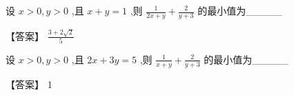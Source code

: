 \documentclass[11pt,a4paper]{article}
\begin{document}
\begin{problem} 
设 \(\displaystyle x > 0,y > 0\) ,且 \(\displaystyle x + y = 1\) ,则 \(\displaystyle \frac{1}{{2x} + y} + \frac{2}{y + 3}\) 的最小值为\_\_\_\_\_
\begin{jiexi}
【答案】 \(\displaystyle \frac{3 + 2\sqrt{2}}{5}\)


\end{jiexi}
\end{problem}
\begin{problem} 
设 \(\displaystyle x > 0,y > 0\) ,且 \(\displaystyle {2x} + {3y} = 5\) ,则 \(\displaystyle \frac{1}{x + y} + \frac{2}{y + 3}\) 的最小值为\_\_\_\_\_
\begin{jiexi}
【答案】 1 

\end{jiexi}
\end{problem}
\end{document}
